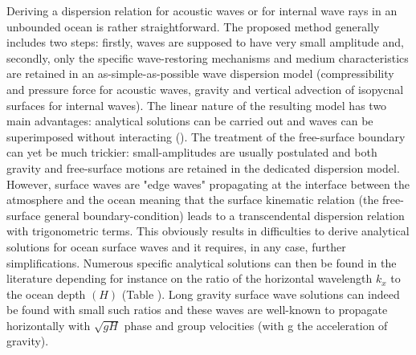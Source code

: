 \documentclass[a4paper,11pt]{article}
\begin{document}
Deriving a dispersion relation for acoustic waves or for internal wave rays in an unbounded ocean is rather straightforward. The proposed method generally includes two steps: firstly, waves are supposed to have very small amplitude and, secondly, only the specific wave-restoring mechanisms and medium characteristics are retained in an as-simple-as-possible wave dispersion model (compressibility and pressure force for acoustic waves, gravity and vertical advection of isopycnal surfaces for internal waves). The linear nature of the resulting model has two main advantages: analytical solutions can be carried out and waves can be superimposed without interacting (\cite{lighthill_1967}).
The treatment of the free-surface boundary can yet be much trickier: small-amplitudes are usually postulated and both gravity and free-surface motions are retained in the dedicated dispersion model. However, surface waves are "edge waves" propagating at the interface between the atmosphere and the ocean meaning that the surface kinematic relation (the free-surface general boundary-condition) leads to a transcendental dispersion relation with trigonometric terms. This obviously results in difficulties to derive analytical solutions for ocean surface waves and it requires, in any case, further simplifications. Numerous specific analytical solutions can then be found in the literature depending for instance on the ratio of the horizontal wavelength $k_x$ to the ocean depth $(H)$ (Table ). Long gravity surface wave solutions can indeed be found with small such ratios and these waves are well-known to propagate horizontally with $\sqrt{g H}$ phase and group velocities (with g the acceleration of gravity).\\

\end{document}
